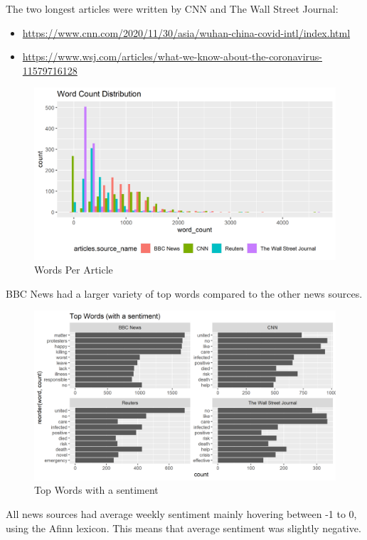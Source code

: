 \documentclass[
]{article}
\begin{document}
The two longest articles were written by CNN and The Wall Street
Journal:

\begin{itemize}
\item
  \url{https://www.cnn.com/2020/11/30/asia/wuhan-china-covid-intl/index.html}
\item
  \url{https://www.wsj.com/articles/what-we-know-about-the-coronavirus-11579716128}
\end{itemize}

\begin{figure}
\centering
\includegraphics{../figures/words_per_article.png}
\caption{Words Per Article}
\end{figure}

BBC News had a larger variety of top words compared to the other news
sources.

\begin{figure}
\centering
\includegraphics{../figures/top_words_with_sentiment.png}
\caption{Top Words with a sentiment}
\end{figure}

All news sources had average weekly sentiment mainly hovering between -1
to 0, using the Afinn lexicon. This means that average sentiment was
slightly negative.
\end{document}
